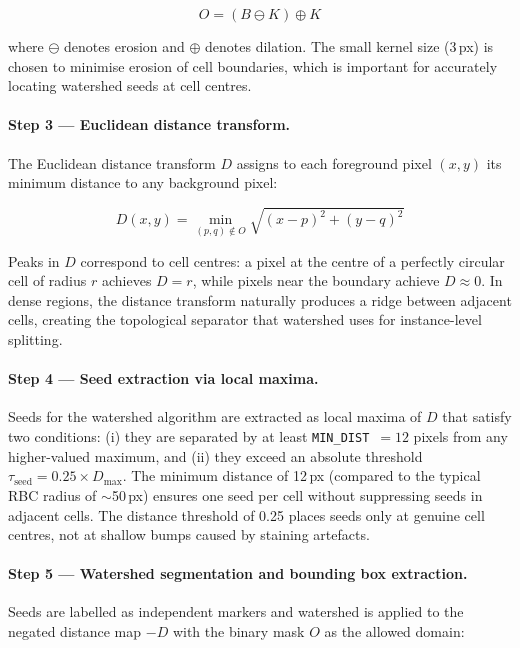 \documentclass[10pt,twocolumn]{article}
\begin{document}
\begin{equation}
  O = (B \ominus K) \oplus K
  \label{eq:open}
\end{equation}

where $\ominus$ denotes erosion and $\oplus$ denotes dilation. The small
kernel size (3\,px) is chosen to minimise erosion of cell boundaries,
which is important for accurately locating watershed seeds at cell centres.

\paragraph{Step 3 — Euclidean distance transform.}
The Euclidean distance transform $D$ assigns to each foreground pixel
$(x,y)$ its minimum distance to any background pixel:

\begin{equation}
  D(x,y) = \min_{(p,q) \notin O} \sqrt{(x-p)^2 + (y-q)^2}
  \label{eq:dist}
\end{equation}

Peaks in $D$ correspond to cell centres: a pixel at the centre of a
perfectly circular cell of radius $r$ achieves $D = r$, while pixels
near the boundary achieve $D \approx 0$. In dense regions, the distance
transform naturally produces a ridge between adjacent cells, creating
the topological separator that watershed uses for instance-level splitting.

\paragraph{Step 4 — Seed extraction via local maxima.}
Seeds for the watershed algorithm are extracted as local maxima of $D$
that satisfy two conditions: (i) they are separated by at least
\texttt{MIN\_DIST}~$= 12$ pixels from any higher-valued maximum, and
(ii) they exceed an absolute threshold $\tau_{\text{seed}} = 0.25 \times D_{\max}$.
The minimum distance of 12\,px (compared to the typical RBC radius of
$\sim$50\,px) ensures one seed per cell without suppressing seeds in
adjacent cells. The distance threshold of 0.25 places seeds only at
genuine cell centres, not at shallow bumps caused by staining artefacts.

\paragraph{Step 5 — Watershed segmentation and bounding box extraction.}
Seeds are labelled as independent markers and watershed is applied to the
negated distance map $-D$ with the binary mask $O$ as the allowed domain:
\end{document}
